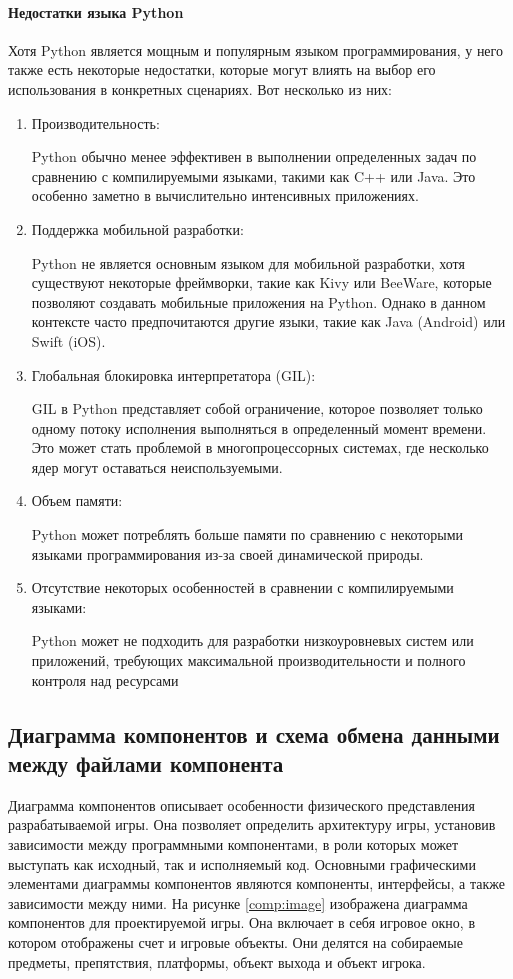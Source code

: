 \paragraph{Недостатки языка Python}

Хотя Python является мощным и популярным языком программирования, у него также есть некоторые недостатки, которые могут влиять на выбор его использования в конкретных сценариях. Вот несколько из них:

\begin{enumerate}
	\item Производительность:
	
	Python обычно менее эффективен в выполнении определенных задач по сравнению с компилируемыми языками, такими как C++ или Java. Это особенно заметно в вычислительно интенсивных приложениях.
	\item Поддержка мобильной разработки:
	
	Python не является основным языком для мобильной разработки, хотя существуют некоторые фреймворки, такие как Kivy или BeeWare, которые позволяют создавать мобильные приложения на Python. Однако в данном контексте часто предпочитаются другие языки, такие как Java (Android) или Swift (iOS).
	\item Глобальная блокировка интерпретатора (GIL):
	
	GIL в Python представляет собой ограничение, которое позволяет только одному потоку исполнения выполняться в определенный момент времени. Это может стать проблемой в многопроцессорных системах, где несколько ядер могут оставаться неиспользуемыми.
	\item Объем памяти:
	
	Python может потреблять больше памяти по сравнению с некоторыми языками программирования из-за своей динамической природы.
	\item Отсутствие некоторых особенностей в сравнении с компилируемыми языками:
	
	Python может не подходить для разработки низкоуровневых систем или приложений, требующих максимальной производительности и полного контроля над ресурсами
\end{enumerate}

\subsection{Диаграмма компонентов и схема обмена данными между файлами компонента}

Диаграмма компонентов описывает особенности физического представления разрабатываемой игры. Она позволяет определить архитектуру игры, установив зависимости между программными компонентами, в роли которых может выступать как исходный, так и исполняемый код. Основными графическими элементами диаграммы компонентов являются компоненты, интерфейсы, а также зависимости между ними. На рисунке \ref{comp:image} изображена диаграмма компонентов для проектируемой игры. Она включает в себя игровое окно, в котором отображены счет и игровые объекты. Они делятся на собираемые предметы, препятствия, платформы, объект выхода и объект игрока.

